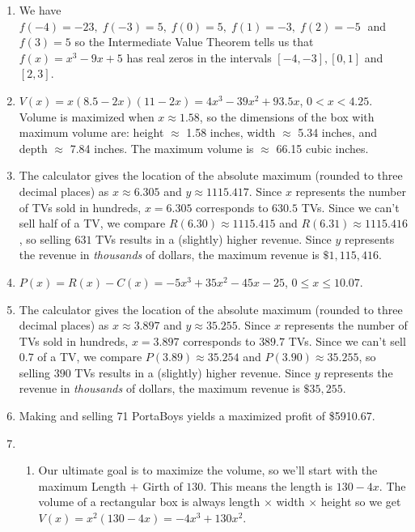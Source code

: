 \documentclass{ximera}
\begin{document}
\begin{enumerate}
\setcounter{enumi}{\value{HW}}

\item We have $f(-4)=-23,\; f(-3)=5,\; f(0)=5,\; f(1)=-3,\; f(2)=-5\;$ and $f(3)=5$ so the Intermediate Value Theorem tells us that $f(x) = x^{3} - 9x + 5$ has real zeros in the intervals $[-4, -3], [0, 1]$ and $[2, 3]$.

\item  $V(x) = x(8.5-2x)(11-2x) = 4x^3-39x^2+93.5x$, $0 < x < 4.25$.  Volume is maximized when $x \approx 1.58$, so the dimensions of the box with maximum volume are: height $\approx$ 1.58 inches, width $\approx$ 5.34 inches, and depth $\approx$ 7.84 inches.  The maximum volume is $\approx$ 66.15 cubic inches.


\item The calculator gives the location  of the absolute maximum (rounded to three decimal places) as $x \approx 6.305$ and $y \approx 1115.417$.  Since $x$ represents the number of TVs sold in hundreds, $x = 6.305$ corresponds to $630.5$ TVs.  Since we can't sell half of a TV, we compare $R(6.30) \approx 1115.415$ and $R(6.31) \approx 1115.416$, so selling $631$ TVs results in a (slightly) higher revenue.  Since $y$ represents the revenue in \textit{thousands} of dollars, the maximum revenue is $\$ 1,\!115,\!416$.

\item $P(x) = R(x) - C(x) = -5x^3+35x^2-45x-25$, $0 \leq x \leq 10.07$.

\item  The calculator gives the location  of the absolute maximum (rounded to three decimal places) as $x \approx 3.897$ and $y \approx 35.255$.  Since $x$ represents the number of TVs sold in hundreds, $x = 3.897$ corresponds to $389.7$ TVs.  Since we can't sell $0.7$ of a TV, we compare $P(3.89) \approx 35.254$ and $P(3.90) \approx 35.255$, so selling $390$ TVs results in a (slightly) higher revenue.  Since $y$ represents the revenue in \textit{thousands} of dollars, the maximum revenue is $\$ 35,\!255$.

\item Making and selling 71 PortaBoys yields a maximized profit of \$5910.67.


\item \begin{enumerate}

\item Our ultimate goal is to maximize the volume, so we'll start with the maximum Length $+$ Girth of $130.$  This means the length is $130 - 4x$.  The volume of a rectangular box is always length $\times$ width $\times$ height so we get $V(x) = x^{2}(130 - 4x) = -4x^{3} + 130x^{2}$.  


\end{enumerate}
\end{enumerate}
\end{document}
